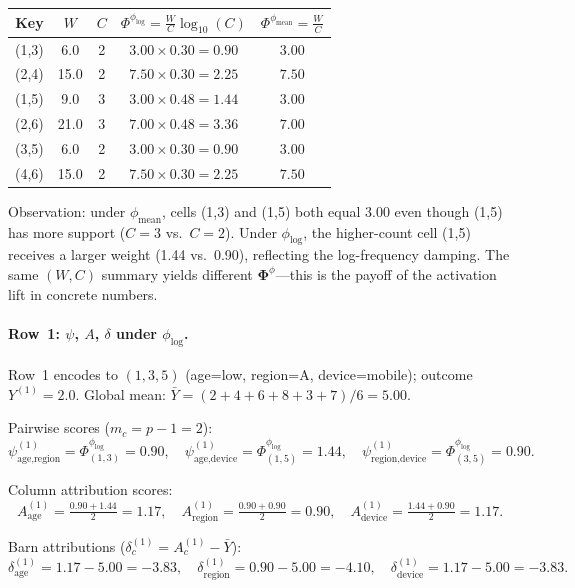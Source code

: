 \documentclass[11pt]{article}
\begin{document}
\medskip
\begin{center}
\begin{tabular}{ccc|cc}
\hline
Key & $W$ & $C$ & $\Phi^{\phi_{\log}} = \tfrac{W}{C}\log_{10}(C)$ & $\Phi^{\phi_{\mathrm{mean}}} = \tfrac{W}{C}$ \\
\hline
(1,3) & 6.0  & 2 & $3.00 \times 0.30 = 0.90$ & $3.00$ \\
(2,4) & 15.0 & 2 & $7.50 \times 0.30 = 2.25$ & $7.50$ \\
(1,5) & 9.0  & 3 & $3.00 \times 0.48 = 1.44$ & $3.00$ \\
(2,6) & 21.0 & 3 & $7.00 \times 0.48 = 3.36$ & $7.00$ \\
(3,5) & 6.0  & 2 & $3.00 \times 0.30 = 0.90$ & $3.00$ \\
(4,6) & 15.0 & 2 & $7.50 \times 0.30 = 2.25$ & $7.50$ \\
\hline
\end{tabular}
\end{center}

\noindent
Observation: under $\phi_{\mathrm{mean}}$, cells (1,3) and (1,5) both equal 3.00 even though (1,5) has more support ($C=3$ vs.\ $C=2$).
Under $\phi_{\log}$, the higher-count cell (1,5) receives a larger weight (1.44 vs.\ 0.90), reflecting the log-frequency damping.
The same $(W,C)$ summary yields different $\bm{\Phi}^\phi$---this is the payoff of the activation lift in concrete numbers.

\paragraph{Row~1: $\psi$, $A$, $\delta$ under $\phi_{\log}$.}
Row~1 encodes to $(1, 3, 5)$ (age=low, region=A, device=mobile); outcome $Y^{(1)} = 2.0$.
Global mean: $\bar{Y} = (2+4+6+8+3+7)/6 = 5.00$.

Pairwise scores ($m_c = p - 1 = 2$):
\[
  \psi_{\text{age,region}}^{(1)} = \Phi^{\phi_{\log}}_{(1,3)} = 0.90, \quad
  \psi_{\text{age,device}}^{(1)} = \Phi^{\phi_{\log}}_{(1,5)} = 1.44, \quad
  \psi_{\text{region,device}}^{(1)} = \Phi^{\phi_{\log}}_{(3,5)} = 0.90.
\]

Column attribution scores:
\[
  A_{\text{age}}^{(1)} = \tfrac{0.90 + 1.44}{2} = 1.17, \quad
  A_{\text{region}}^{(1)} = \tfrac{0.90 + 0.90}{2} = 0.90, \quad
  A_{\text{device}}^{(1)} = \tfrac{1.44 + 0.90}{2} = 1.17.
\]

Barn attributions ($\delta_c^{(1)} = A_c^{(1)} - \bar{Y}$):
\[
  \delta_{\text{age}}^{(1)} = 1.17 - 5.00 = -3.83, \quad
  \delta_{\text{region}}^{(1)} = 0.90 - 5.00 = -4.10, \quad
  \delta_{\text{device}}^{(1)} = 1.17 - 5.00 = -3.83.
\]
\end{document}
